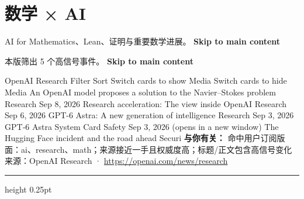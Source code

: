 \documentclass[10.5pt]{ctexart}
\begin{document}
\section*{数学 × AI}
{\color{ormuted} AI for Mathematics、Lean、证明与重要数学进展。}
\vspace{2mm}
{\LARGE\bfseries Skip to main content}\par
\vspace{1mm}
{\color{ormuted} 本版筛出 5 个高信号事件。}
\vspace{3mm}
{\Large\bfseries Skip to main content}\par
OpenAI Research Filter Sort Switch cards to show Media Switch cards to hide Media An OpenAI model proposes a solution to the Navier–Stokes problem Research Sep 8, 2026 Research acceleration: The view inside OpenAI Research Sep 6, 2026 GPT-6 Astra: A new generation of intelligence Research Sep 3, 2026 GPT‑6 Astra System Card Safety Sep 3, 2026 (opens in a new window) The Hugging Face incident and the road ahead Securi
\textbf{与你有关：} 命中用户订阅版面：ai、research、math；来源接近一手且权威度高；标题/正文包含高信号变化
{\footnotesize\color{ormuted} 来源：OpenAI Research · \url{https://openai.com/news/research}}
\vspace{4mm}
\hrule height 0.25pt
\vspace{3mm}
\end{document}
